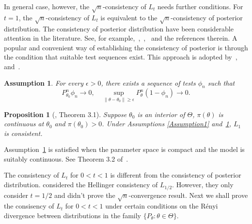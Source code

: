 \documentclass[3p]{elsarticle}
\theoremstyle{plain}
\newtheorem{proposition}{\quad\quad Proposition}
\newtheorem{assumption}{\quad\quad Assumption}
\theoremstyle{definition}
\theoremstyle{remark}
\begin{document}
 In general case, however, the $\sqrt{n}$-consistency of $L_t$ needs further conditions.
 For $t=1$, the $\sqrt{n}$-consistency of $L_t$ is equivalent to the $\sqrt{n}$-consistency of posterior distribution.
 The consistency of posterior distribution have been considerable attention in the literature.
 See, for example,~\cite{ghosal2000},~\cite{Shen2001Rates},~\cite{vaart2007convergence} and the references therein.
A popular and convenient way of establishing the consistency of posterior is through the condition that suitable test sequences exist.
This approach is adopted by~\cite{ghosal2000},~\cite{vaart2007convergence} and~\cite{Kleijn2012The}.

\begin{assumption}\label{Assumption2}
    For every $\epsilon>0$, there exists a sequence of tests $\phi_n$ such that
        \begin{equation}
            P_{\theta_0}^n\phi_n\to 0,\quad \sup_{\|\theta-\theta_0\|\geq \epsilon} P_\theta^n(1-\phi_n)\to 0.
        \end{equation}
\end{assumption}

\begin{proposition}[\cite{Kleijn2012The}, Theorem 3.1]
    Suppose $\theta_0$ is an interior of $\Theta$, $\pi(\theta)$ is continuous at $\theta_0$ and $\pi(\theta_0)>0$.
    Under Assumptions \ref{Assumption1} and~\ref{Assumption2}, $L_1$ is consistent.
\end{proposition}
Assumption~\ref{Assumption2} is satisfied when the parameter space is compact and the model is suitably continuous. See Theorem 3.2 of~\cite{Kleijn2012The}.

The consistency of $L_t$ for $0<t<1$ is different from the consistency of posterior distribution.
\cite{kar10563} considered the Hellinger consistency of $L_{1/2}$.
However, they only consider $t=1/2$ and didn't prove the $\sqrt{n}$-convergence result.
Next we shall prove the consisency of $L_{t}$ for $0<t<1$ under certain conditions on the R\'{e}nyi divergence between distributions in the family $\{P_\theta:\theta\in\Theta\}$.
\end{document}
